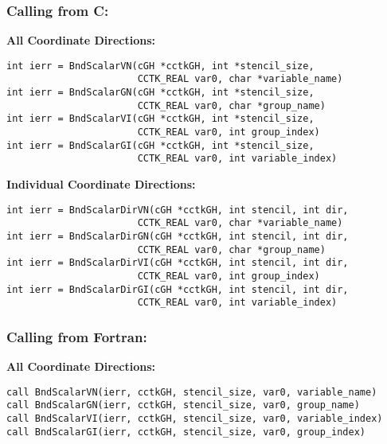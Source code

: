 \documentclass{article}
\begin{document}
\subsubsection*{Calling from C:}

{\bf All Coordinate Directions:}
\begin{verbatim}
int ierr = BndScalarVN(cGH *cctkGH, int *stencil_size,  
                       CCTK_REAL var0, char *variable_name)
int ierr = BndScalarGN(cGH *cctkGH, int *stencil_size,  
                       CCTK_REAL var0, char *group_name)
int ierr = BndScalarVI(cGH *cctkGH, int *stencil_size,  
                       CCTK_REAL var0, int group_index)
int ierr = BndScalarGI(cGH *cctkGH, int *stencil_size,  
                       CCTK_REAL var0, int variable_index)
\end{verbatim}

\noindent
{\bf Individual Coordinate Directions:}
\begin{verbatim}
int ierr = BndScalarDirVN(cGH *cctkGH, int stencil, int dir,
                       CCTK_REAL var0, char *variable_name)
int ierr = BndScalarDirGN(cGH *cctkGH, int stencil, int dir,
                       CCTK_REAL var0, char *group_name)
int ierr = BndScalarDirVI(cGH *cctkGH, int stencil, int dir,
                       CCTK_REAL var0, int group_index)
int ierr = BndScalarDirGI(cGH *cctkGH, int stencil, int dir,
                       CCTK_REAL var0, int variable_index)
\end{verbatim}

\subsubsection*{Calling from Fortran:}
{\bf All Coordinate Directions:}
\begin{verbatim}
call BndScalarVN(ierr, cctkGH, stencil_size, var0, variable_name)
call BndScalarGN(ierr, cctkGH, stencil_size, var0, group_name)
call BndScalarVI(ierr, cctkGH, stencil_size, var0, variable_index)
call BndScalarGI(ierr, cctkGH, stencil_size, var0, group_index)
\end{verbatim}
\end{document}

